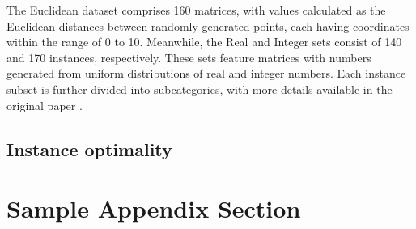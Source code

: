 \documentclass[preprint,12pt]{elsarticle}
\begin{document}
The Euclidean dataset comprises 160 matrices, with values calculated as the Euclidean distances between randomly generated points, each having coordinates within the range of 0 to 10. Meanwhile, the Real and Integer sets consist of 140 and 170 instances, respectively. These sets feature matrices with numbers generated from uniform distributions of real and integer numbers. Each instance subset is further divided into subcategories, with more details available in the original paper \citet{marti2021mdplib}.
\subsection{Instance optimality}

\appendix

\section{Sample Appendix Section}
\label{sec:sample:appendix}

 






\end{document}
